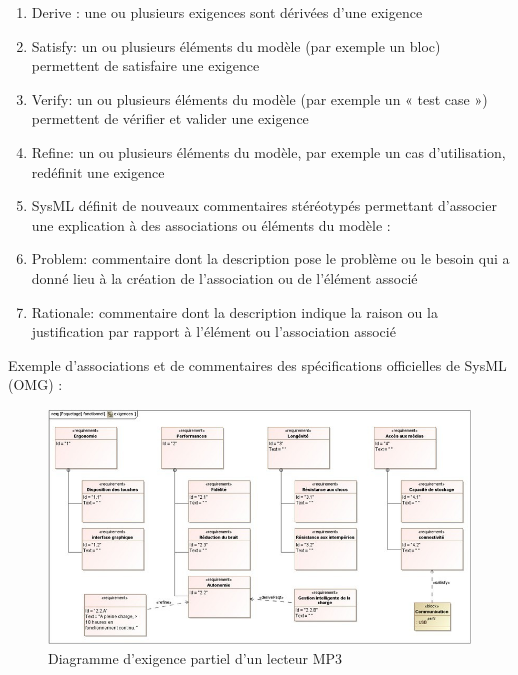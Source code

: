 \documentclass[12pt,a4paper]{report}
\begin{document}
\begin{enumerate}
	\item  Derive : une ou plusieurs exigences sont d\'{e}riv\'{e}es d'une exigence
	
	\item  Satisfy: un ou plusieurs \'{e}l\'{e}ments du mod\`{e}le (par exemple un bloc) permettent de satisfaire une exigence
	
	\item  Verify: un ou plusieurs \'{e}l\'{e}ments du mod\`{e}le (par exemple un « test case ») permettent de v\'{e}rifier et valider une exigence
	
	\item  Refine: un ou plusieurs \'{e}l\'{e}ments du mod\`{e}le, par exemple un cas d'utilisation, red\'{e}finit une exigence
	
	\item  SysML d\'{e}finit de nouveaux commentaires st\'{e}r\'{e}otyp\'{e}s permettant d'associer une explication \`{a} des associations ou \'{e}l\'{e}ments du mod\`{e}le :
	
	\item  Problem: commentaire dont la description pose le probl\`{e}me ou le besoin qui a donn\'{e} lieu \`{a} la cr\'{e}ation de l'association ou de l'\'{e}l\'{e}ment associ\'{e}
	
	\item  Rationale: commentaire dont la description indique la raison ou la justification par rapport \`{a} l'\'{e}l\'{e}ment ou l'association associ\'{e}
\end{enumerate}

\noindent \begin{flushleft}
	
	
	\noindent Exemple d'associations et de commentaires des sp\'{e}cifications officielles de SysML (OMG) : 
\end{flushleft}


\begin{figure}[H]
	\centering
	\includegraphics[width=0.8\linewidth]{image6.png}
	\caption{Diagramme d'exigence partiel d'un lecteur MP3}
	
\end{figure}
\end{document}

